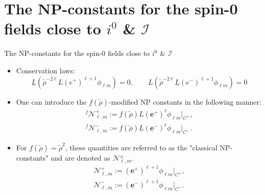 \documentclass{beamer}
\theoremstyle{remark}
\theoremstyle{plain}
\theoremstyle{plain}
\begin{document}
\section{The NP-constants for the spin-0 fields close to $i^0$ \& $\mathscr{I}$}
\begin{frame}{The NP-constants for the spin-0 fields close to $i^0$ \& $\mathscr{I}$}
  \begin{itemize}
    \item Conservation laws:
    \begin{equation}\label{eq:cons_laws}
      {\underline{{L}}}({\tilde{\rho}}^{-2\ell}L(e^{+})^{\ell+1}\phi_{\ell m})=0, \qquad L({\tilde{\rho}}^{-2\ell}\underline{L}(e^{-})^{\ell+1}\phi_{\ell m})=0
    \end{equation}
    \item One can introduce the $f(\tilde{\rho})$-modified NP constants in the following manner: 
    \begin{align}\label{eq:DefModifiedNP}
      {}^{f}\mathcal{N}^{+}_{\ell,m}:= f(\tilde{\rho})L (\boldsymbol{e}^{+})^{\ell}\phi_{\ell m} \Big|_{{C}^{+}}, \\ 
      {}^{f}\mathcal{N}^{-}_{\ell,m}:= f(\tilde{\rho})\underline{L} (\boldsymbol{\underline{e}}^{-})^{\ell}\phi_{\ell m}\Big|_{{C}^{-}}.
    \end{align}
    \item For $f(\tilde{\rho})=\tilde{\rho}^2$, these quantities are referred to as the "classical NP-constants" and are denoted as $\mathcal{N}^{\pm}_{\ell,m}$.
    \begin{align}\label{eq:classicalNP}
      \mathcal{N}^{+}_{\ell,m}:= (\boldsymbol{e}^{+})^{\ell+1}\phi_{\ell m}\Big|_{{C}^{+}},\\ 
      \mathcal{N}^{-}_{\ell,m}:= (\boldsymbol{\underline{e}}^{-})^{\ell+1}\phi_{\ell m} \Big|_{{C}^{-}}.
    \end{align}
  \end{itemize}
\end{frame}
\end{document}
